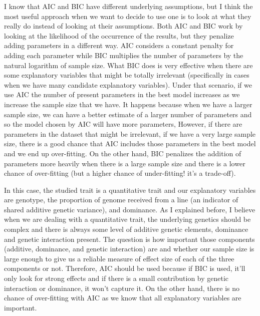 \documentclass[
]{article}
\begin{document}
I know that AIC and BIC have different underlying assumptions, but I
think the most useful approach when we want to decide to use one is to
look at what they really do instead of looking at their assumptions.
Both AIC and BIC work by looking at the likelihood of the occurrence of
the results, but they penalize adding parameters in a different way. AIC
considers a constant penalty for adding each parameter while BIC
multiplies the number of parameters by the natural logarithm of sample
size. What BIC does is very effective when there are some explanatory
variables that might be totally irrelevant (specifically in cases when
we have many candidate explanatory variables). Under that scenario, if
we use AIC the number of present parameters in the best model increases
as we increase the sample size that we have. It happens because when we
have a larger sample size, we can have a better estimate of a larger
number of parameters and so the model chosen by AIC will have more
parameters, However, if there are parameters in the dataset that might
be irrelevant, if we have a very large sample size, there is a good
chance that AIC includes those parameters in the best model and we end
up over-fitting. On the other hand, BIC penalizes the addition of
parameters more heavily when there is a large sample size and there is a
lower chance of over-fitting (but a higher chance of under-fitting! it's
a trade-off).

In this case, the studied trait is a quantitative trait and our
explanatory variables are genotype, the proportion of genome received
from a line (an indicator of shared additive genetic variance), and
dominance. As I explained before, I believe when we are dealing with a
quantitative trait, the underlying genetics should be complex and there
is always some level of additive genetic elements, dominance and genetic
interaction present. The question is how important those components
(additive, dominance, and genetic interaction) are and whether our
sample size is large enough to give us a reliable measure of effect size
of each of the three components or not. Therefore, AIC should be used
because if BIC is used, it'll only look for strong effects and if there
is a small contribution by genetic interaction or dominance, it won't
capture it. On the other hand, there is no chance of over-fitting with
AIC as we know that all explanatory variables are important.~
\end{document}
